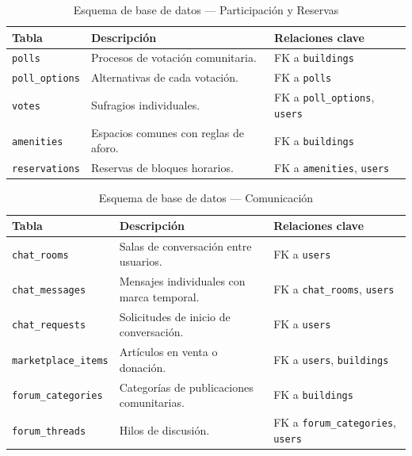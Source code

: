 \begin{table}[H]
\centering
\caption{Esquema de base de datos --- Participación y Reservas}\label{tab:esquema-participacion}
\begin{tabular}{|p{}|p{}|p{}|}
\hline
\textbf{Tabla} & \textbf{Descripción} & \textbf{Relaciones clave} \\
\hline
\texttt{polls} & Procesos de votación comunitaria. & FK a \texttt{buildings} \\
\hline
\texttt{poll\_options} & Alternativas de cada votación. & FK a \texttt{polls} \\
\hline
\texttt{votes} & Sufragios individuales. & FK a \texttt{poll\_options}, \texttt{users} \\
\hline
\texttt{amenities} & Espacios comunes con reglas de aforo. & FK a \texttt{buildings} \\
\hline
\texttt{reservations} & Reservas de bloques horarios. & FK a \texttt{amenities}, \texttt{users} \\
\hline
\end{tabular}
\end{table}

\begin{table}[H]
\centering
\caption{Esquema de base de datos --- Comunicación}\label{tab:esquema-comunicacion}
\begin{tabular}{|p{}|p{}|p{}|}
\hline
\textbf{Tabla} & \textbf{Descripción} & \textbf{Relaciones clave} \\
\hline
\texttt{chat\_rooms} & Salas de conversación entre usuarios. & FK a \texttt{users} \\
\hline
\texttt{chat\_messages} & Mensajes individuales con marca temporal. & FK a \texttt{chat\_rooms}, \texttt{users} \\
\hline
\texttt{chat\_requests} & Solicitudes de inicio de conversación. & FK a \texttt{users} \\
\hline
\texttt{marketplace\_items} & Artículos en venta o donación. & FK a \texttt{users}, \texttt{buildings} \\
\hline
\texttt{forum\_categories} & Categorías de publicaciones comunitarias. & FK a \texttt{buildings} \\
\hline
\texttt{forum\_threads} & Hilos de discusión. & FK a \texttt{forum\_categories}, \texttt{users} \\
\hline
\end{tabular}
\end{table}

